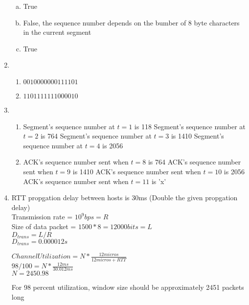 \documentclass[14pt]{article}
\begin{document}
\begin{enumerate}
\begin{enumerate}[(a)]
\item
True

\item
False, the sequence number depends on the bumber of 8 byte characters in the current segment

\item
True

\end{enumerate}
\item
\begin{enumerate}[(1)]
\item
$0010000000111101$

\item
$1101111111000010$ 

\end{enumerate}

\item
\begin{enumerate}[(1)]
\item
Segment's sequence number at $t=1$ is 118
Segment's sequence number at $t=2$ is 764
Segment's sequence number at $t=3$ is 1410
Segment's sequence number at $t=4$ is 2056

\item
ACK's sequence number sent when $t=8$ is 764
ACK's sequence number sent when $t=9$ is 1410
ACK's sequence number sent when $t=10$ is 2056
ACK's sequence number sent when $t=11$ is 'x'

\end{enumerate}

\item
RTT propgation delay between hosts is 30ms (Double the given propgation delay) \\
Transmission rate = $10^9 bps = R$ \\
Size of data packet = $1500 * 8 = 12000 bits = L$ \\

$D_{trans} = L/R$ \\
$D_{trans} = 0.000012 s$ 

$Channel Utilization = N * \frac{12micros}{12micros + RTT}$ \\
$98/100 = N * \frac{12ms}{30.012ms}$ \\
$N = 2450.98$

For 98 percent utilization, window size should be approximately 2451 packets long

\end{enumerate}
\end{document}
